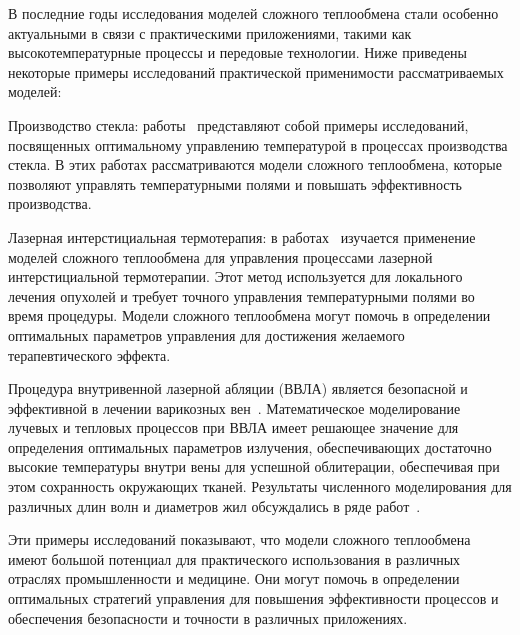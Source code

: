 В последние годы исследования моделей сложного теплообмена стали особенно
актуальными в связи с практическими приложениями, такими
как высокотемпературные процессы и передовые технологии.
Ниже приведены некоторые примеры исследований практической применимости рассматриваемых моделей:

Производство стекла: работы~\cite{frank2010optimal, clever2012optimal} представляют
собой примеры исследований, посвященных оптимальному
управлению температурой в процессах производства стекла.
В этих работах рассматриваются модели сложного теплообмена, которые позволяют управлять
температурными полями и повышать эффективность производства.

Лазерная интерстициальная термотерапия: в работах~\cite{Tse2012, Hubner2017}
изучается применение моделей сложного теплообмена для
управления процессами лазерной интерстициальной термотерапии.
Этот метод используется для локального лечения опухолей и
требует точного управления температурными полями во время процедуры.
Модели сложного теплообмена могут помочь в определении оптимальных
параметров управления для достижения желаемого терапевтического эффекта.

Процедура внутривенной лазерной абляции (ВВЛА) является безопасной и эффективной
в лечении варикозных вен~\cite{Endovenous_vandenBos2009}.
Математическое моделирование лучевых и тепловых процессов при ВВЛА
имеет решающее значение для определения оптимальных параметров
излучения, обеспечивающих достаточно высокие
температуры внутри вены для успешной облитерации,
обеспечивая при этом сохранность окружающих тканей.
Результаты численного моделирования для различных
длин волн и диаметров жил обсуждались в ряде работ~\cite{
    Opticalthermal_vanRuijven2014, Some_Poluektova2014,
    Endovenous_Malskat2014, Mathematical_Mordon2006,
}.


Эти примеры исследований показывают, что модели сложного теплообмена имеют
большой потенциал для практического использования в различных отраслях промышленности и медицине.
Они могут помочь в определении оптимальных стратегий
управления для повышения эффективности процессов
и обеспечения безопасности и точности в различных приложениях.

%


